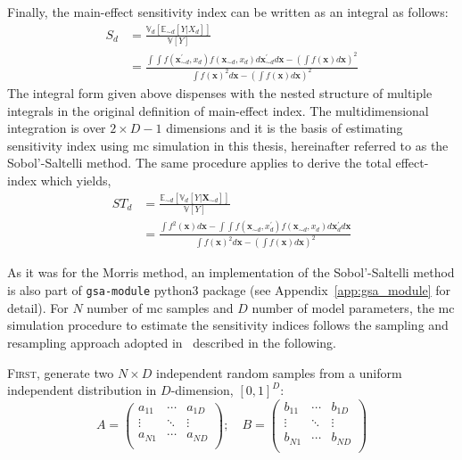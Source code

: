 Finally, the main-effect sensitivity index can be written as an integral as follows:
\begin{equation}
  \begin{split}
    S_d & = \frac{\mathbb{V}_d [\mathbb{E}_{\sim d} [Y|X_d]]}{\mathbb{V}[Y]} \\
        & = \frac{\int \int f(\mathbf{x}^{\prime}_{\sim d}, x_d) f(\mathbf{x}_{\sim d}, x_d) d\mathbf{x}^{\prime}_{\sim d} d\mathbf{x} - \left(\int f(\mathbf{x}) d\mathbf{x}\right)^2}{\int f(\mathbf{x})^2 d\mathbf{x} - \left( \int f(\mathbf{x}) d\mathbf{x}\right)^2}
  \end{split}
\label{eq:ss_main_effect_integral}
\end{equation}
The integral form given above dispenses with the nested structure of multiple integrals in the original definition of main-effect index.
The multidimensional integration is over $2 \times D - 1$ dimensions 
and it is the basis of estimating sensitivity index using \gls{mc} simulation in this thesis, hereinafter referred to as the Sobol'-Saltelli method.
The same procedure applies to derive the total effect-index which yields,
\begin{equation}
  \begin{split}
    ST_d & = \frac{\mathbb{E}_{\sim d}[\mathbb{V}_{d}[Y|\mathbf{X}_{\sim d}]]}{\mathbb{V}[Y]} \\
        & = \frac{\int f^2(\mathbf{x}) d\mathbf{x} - \int \int f(\mathbf{x}_{\sim d}, x^{\prime}_d) f(\mathbf{x}_{\sim d}, x_d) d\mathbf{x}^{\prime}_{d} d\mathbf{x}}{\int f(\mathbf{x})^2 d\mathbf{x} - \left( \int f(\mathbf{x}) d\mathbf{x}\right)^2}
  \end{split}
\label{eq:ss_total_effect_integral}
\end{equation}

As it was for the Morris method, an implementation of the Sobol'-Saltelli method is also part of \texttt{gsa-module} python3 package (see Appendix~\ref{app:gsa_module} for detail). 
For $N$ number of \gls{mc} samples and $D$ number of model parameters, the \gls{mc} simulation procedure to estimate the sensitivity indices follows the sampling and resampling approach adopted in~\cite{Sobol2001,Saltelli2002,Homma1996} described in the following.

\textsc{First}, generate two $N \times D$ independent random samples from a uniform independent distribution in $D$-dimension, $[0,1]^D$:
\begin{equation}
A = 
\begin{pmatrix}
a_{11}  & \cdots  & a_{1D}\\
\vdots	& \ddots & \vdots\\
a_{N1}  & \cdots  & a_{ND}\\
\end{pmatrix}
;\quad B = 
\begin{pmatrix}
b_{11}  & \cdots  & b_{1D}\\
\vdots	& \ddots & \vdots\\
b_{N1}  & \cdots  & b_{ND}\\
\end{pmatrix}
\label{eq:ss_two_samples}
\end{equation}

